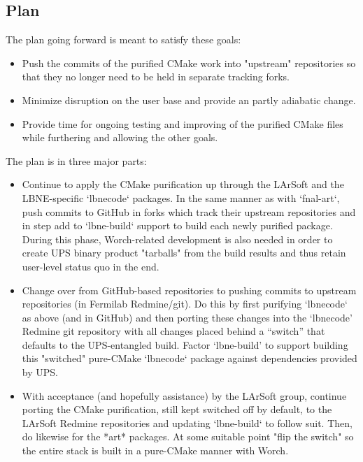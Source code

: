 \documentclass[usletter]{article}
\begin{document}
\subsection{Plan}

The plan going forward is meant to satisfy these goals:
\begin{itemize}
	\item Push the commits of the purified CMake work into "upstream"
    repositories so that they no longer need to be held in separate
    tracking forks.
	\item Minimize disruption on the user base and provide an partly adiabatic
    change.
	\item Provide time for ongoing testing and improving of the purified CMake
    files while furthering and allowing the other goals.
\end{itemize}


The plan is in three major parts:
\begin{itemize}
	\item Continue to apply the CMake purification up through the LArSoft and the LBNE-specific
    `lbnecode` packages. In the same manner as with `fnal-art`, push
    commits to GitHub in forks which track their upstream repositories
    and in step add to `lbne-build` support to build each newly purified
    package. During this phase, Worch-related development is also needed
    in order to create UPS binary product "tarballs" from the build
    results and thus retain user-level status quo in the end.
	\item Change over from GitHub-based repositories to pushing commits to
    upstream repositories (in Fermilab Redmine/git). Do this by first purifying 
    `lbnecode` as above (and in GitHub) and then porting these changes into the
    `lbnecode' Redmine git repository with all changes placed behind a
    ``switch'' that defaults to the UPS-entangled build. Factor
    `lbne-build' to support building this "switched" pure-CMake
    `lbnecode` package against dependencies provided by UPS.
	\item With acceptance (and hopefully assistance) by the LArSoft group,
    continue porting the CMake purification, still kept switched off by
    default, to the LArSoft Redmine repositories and updating
    `lbne-build` to follow suit. Then, do likewise for the *art*
    packages. At some suitable point "flip the switch" so the entire
    stack is built in a pure-CMake manner with Worch.
\end{itemize}
\end{document}
